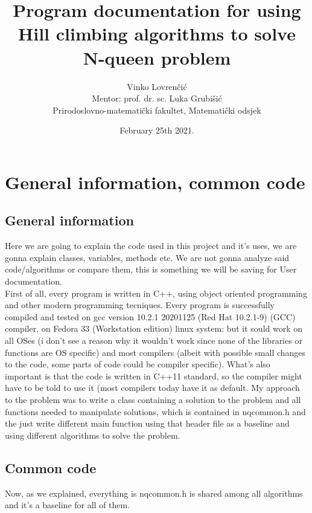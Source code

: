 \documentclass[10pt,a4paper]{article}
\author{Vinko Lovrenčić \\ \footnotesize Mentor: prof. dr. sc. Luka Grubišić \\ Prirodoslovno-matematički fakultet, Matematički odsjek}
\date{February 25th 2021.}
\title{Program documentation for using Hill climbing algorithms to solve N-queen problem}
\begin{document}
	\begin{titlepage}
                \maketitle
        \end{titlepage}
	\tableofcontents
	\section{General information, common code}
		\subsection{General information}
			Here we are going to explain the code used in this project and it's uses, we are gonna explain classes, variables, methods etc. We are not gonna analyze said code/algorithms or compare them, this is something we will be saving for User documentation. \\
			First of all, every program is written in C++, using object oriented programming and other modern programming tecniques. Every program is successfully compiled and tested on gcc version 10.2.1 20201125 (Red Hat 10.2.1-9) (GCC) compiler, on Fedora 33 (Workstation edition) linux system: but it sould work on all OSes (i don't see a reason why it wouldn't work since none of the libraries or functions are OS specific) and most compilers (albeit with possible small changes to the code, some parts of code could be compiler specific). What's also important is that the code is written in C++11 standard, so the compiler might have to be told to use it (most compilers today have it as default.
			My approach to the problem was to write a class containing a solution to the problem and all functions needed to manipulate solutions, which is contained in nqcommon.h and the just write different main function using that header file as a baseline and using different algorithms to solve the problem.
		\subsection{Common code}
			Now, as we explained, everything is nqcommon.h is shared among all algorithms and it's a baseline for all of them.
\end{document}
